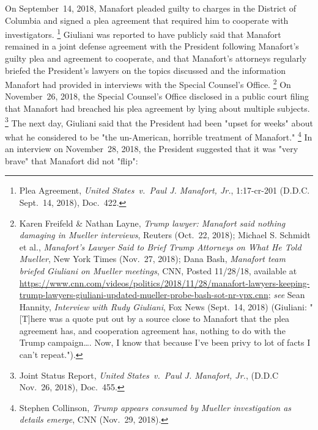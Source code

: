 On September~14, 2018, Manafort pleaded guilty to charges in the District of Columbia and signed a plea agreement that required him to cooperate with investigators.%
\footnote{Plea Agreement, \textit{United States~v.\ Paul J. Manafort, Jr.}, 1:17-cr-201 (D.D.C. Sept.~14, 2018), Doc.~422.}
Giuliani was reported to have publicly said that Manafort remained in a joint defense agreement with the President following Manafort's guilty plea and agreement to cooperate, and that Manafort's attorneys regularly briefed the President's lawyers on the topics discussed and the information Manafort had provided in interviews with the Special Counsel's Office.%
\footnote{Karen Freifeld \& Nathan Layne, \textit{Trump lawyer: Manafort said nothing damaging in Mueller interviews}, Reuters (Oct.~22, 2018);
Michael S. Schmidt et al., \textit{Manafort's Lawyer Said to Brief Trump Attorneys on What He Told Mueller}, New York Times (Nov.~27, 2018);
Dana Bash, \textit{Manafort team briefed Giuliani on Mueller meetings}, CNN, Posted 11/28/18, available at
\url{https://www.cnn.com/videos/politics/2018/11/28/manafort-lawyers-keeping-trump-lawyers-giuliani-updated-mueller-probe-bash-sot-nr-vpx.cnn};
\textit{see} Sean Hannity, \textit{Interview with Rudy Giuliani}, Fox News (Sept.~14, 2018) (Giuliani: "[T]here was a quote put out by a source close to Manafort that the plea agreement has, and cooperation agreement has, nothing to do with the Trump campaign\dots.
Now, I know that because I've been privy to lot of facts I can't repeat.").}
On November~26, 2018, the Special Counsel's Office disclosed in a public court filing that Manafort had breached his plea agreement by lying about multiple subjects.%
\footnote{Joint Status Report, \textit{United States~v.\ Paul J. Manafort, Jr.}, (D.D.C Nov.~26, 2018), Doc.~455.}
The next day, Giuliani said that the President had been "upset for weeks" about what he considered to be "the un-American, horrible treatment of Manafort."%
\footnote{Stephen Collinson, \textit{Trump appears consumed by Mueller investigation as details emerge}, CNN (Nov.~29, 2018).}
In an interview on November~28, 2018, the President suggested that it was "very brave" that Manafort did not "flip":

